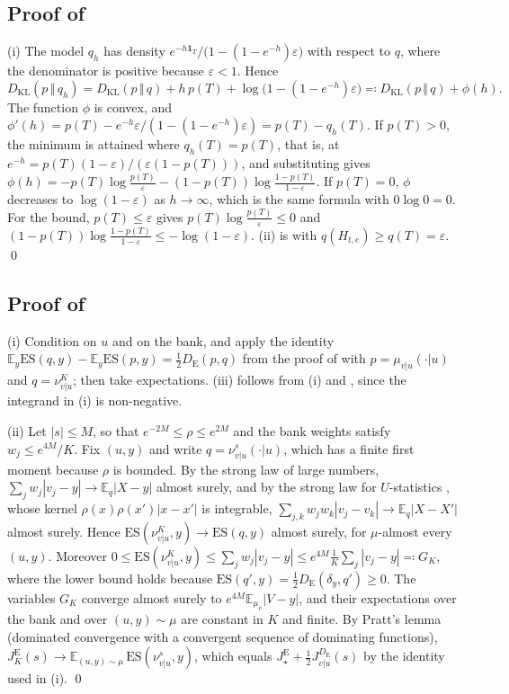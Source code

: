 \documentclass[11pt]{article}
\theoremstyle{plain}
\theoremstyle{definition}
\theoremstyle{remark}
\newcommand{\E}{\mathbb{E}}
\newcommand{\KL}[2]{D_{\mathrm{KL}}\!\left(#1\,\Vert\,#2\right)}
\newcommand{\DE}{D_{\mathrm{E}}}
\newcommand{\abs}[1]{\left\lvert #1 \right\rvert}
\newcommand{\indicator}{\mathbf{1}}
\newcommand{\Jvu}{J_{v\vert u}}
\begin{document}
\subsection{Proof of \texorpdfstring{}{Proposition 4.25}}
\label{app:klvsenergy}
(i) The model $q_h$ has density
$e^{-h\indicator_T}/\bigl(1-(1-e^{-h})\varepsilon\bigr)$ with respect to $q$,
where the denominator is positive because $\varepsilon<1$. Hence
\begin{equation*}
 \KL{p}{q_h}=\KL{p}{q}+h\,p(T)+\log\bigl(1-(1-e^{-h})\varepsilon\bigr)\eqqcolon\KL{p}{q}+\phi(h).
\end{equation*}
The function $\phi$ is convex, and
$\phi'(h)=p(T)-e^{-h}\varepsilon/(1-(1-e^{-h})\varepsilon)=p(T)-q_h(T)$. If
$p(T)>0$, the minimum is attained where $q_h(T)=p(T)$, that is, at
$e^{-h}=p(T)(1-\varepsilon)/(\varepsilon(1-p(T)))$, and substituting gives
$\phi(h)=-p(T)\log\frac{p(T)}{\varepsilon}-(1-p(T))\log\frac{1-p(T)}{1-\varepsilon}$.
If $p(T)=0$, $\phi$ decreases to $\log(1-\varepsilon)$ as $h\to\infty$, which
is the same formula with $0\log0=0$. For the bound, $p(T)\le\varepsilon$
gives $p(T)\log\frac{p(T)}{\varepsilon}\le0$ and
$(1-p(T))\log\frac{1-p(T)}{1-\varepsilon}\le-\log(1-\varepsilon)$. (ii) is
 with $q(H_{t,e})\ge q(T)=\varepsilon$.
\qed

\subsection{Proof of \texorpdfstring{}{Proposition 4.27}}
\label{app:bankenergy}
(i) Condition on $u$ and on the bank, and apply the identity
$\E_y\mathrm{ES}(q,y)-\E_y\mathrm{ES}(p,y)=\tfrac12\DE(p,q)$ from the proof of
 with $p=\mu_{v\vert u}(\cdot\vert u)$ and
$q=\nu^{K}_{v\vert u}$; then take expectations. (iii) follows from (i) and
, since the integrand in (i) is non-negative.

(ii) Let $\abs{s}\le M$, so that $e^{-2M}\le\rho\le e^{2M}$ and the bank
weights satisfy $w_j\le e^{4M}/K$. Fix $(u,y)$ and write
$q=\nu^{s}_{v\vert u}(\cdot\vert u)$, which has a finite first moment because
$\rho$ is bounded. By the strong law of large numbers,
$\sum_jw_j\abs{v_j-y}\to\E_q\abs{X-y}$ almost surely, and by the strong law
for $U$-statistics \cite{hoeffding1961strong}, whose kernel
$\rho(x)\rho(x')\abs{x-x'}$ is integrable,
$\sum_{j,k}w_jw_k\abs{v_j-v_k}\to\E_q\abs{X-X'}$ almost surely. Hence
$\mathrm{ES}(\nu^{K}_{v\vert u},y)\to\mathrm{ES}(q,y)$ almost surely, for
$\mu$-almost every $(u,y)$. Moreover
$0\le\mathrm{ES}(\nu^{K}_{v\vert u},y)\le\sum_jw_j\abs{v_j-y}\le e^{4M}\frac1K\sum_j\abs{v_j-y}\eqqcolon G_K$,
where the lower bound holds because
$\mathrm{ES}(q',y)=\tfrac12\DE(\delta_y,q')\ge0$. The variables $G_K$ converge
almost surely to $e^{4M}\E_{\mu_v}\abs{V-y}$, and their expectations over the
bank and over $(u,y)\sim\mu$ are constant in $K$ and finite. By Pratt's
lemma (dominated convergence with a convergent sequence of dominating
functions), $J^{\mathrm{E}}_{K}(s)\to\E_{(u,y)\sim\mu}\,\mathrm{ES}(\nu^{s}_{v\vert u},y)$,
which equals $J^{\mathrm{E}}_{\star}+\tfrac12\Jvu^{\DE}(s)$ by the identity
used in (i).
\qed
\end{document}
